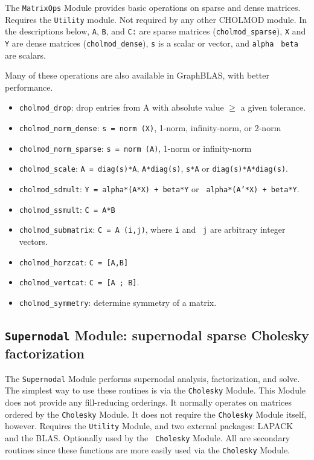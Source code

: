 \documentclass[11pt]{article}
\begin{document}
The {\tt MatrixOps} Module provides basic operations on sparse and dense
matrices.  Requires the {\tt Utility} module.  Not required by any other
CHOLMOD module.  In the descriptions below, {\tt A}, {\tt B}, and {\tt C:} are
sparse matrices ({\tt cholmod\_sparse}), {\tt X} and {\tt Y} are dense matrices
({\tt cholmod\_dense}), {\tt s} is a scalar or vector, and {\tt alpha} {\tt
beta} are scalars.

Many of these operations are also available in GraphBLAS, with better
performance.

    \begin{itemize}
    \item {\tt cholmod\_drop}: drop entries from A with absolute value $\ge$ a
        given tolerance.
    \item {\tt cholmod\_norm\_dense}: {\tt s = norm (X)}, 1-norm,
        infinity-norm, or 2-norm
    \item {\tt cholmod\_norm\_sparse}: {\tt s = norm (A)}, 1-norm or
        infinity-norm
    \item {\tt cholmod\_scale}: {\tt A = diag(s)*A}, {\tt A*diag(s)}, {\tt s*A}
        or {\tt diag(s)*A*diag(s)}.
    \item {\tt cholmod\_sdmult}: {\tt Y = alpha*(A*X) + beta*Y} or {\tt
        alpha*(A'*X) + beta*Y}.
    \item {\tt cholmod\_ssmult}: {\tt C = A*B}
    \item {\tt cholmod\_submatrix}: {\tt C = A (i,j)}, where {\tt i} and {\tt
        j} are arbitrary integer vectors.
    \item {\tt cholmod\_horzcat}: {\tt C = [A,B]}
    \item {\tt cholmod\_vertcat}: {\tt C = [A ; B]}.
    \item {\tt cholmod\_symmetry}: determine symmetry of a matrix.
    \end{itemize}

\subsection{{\tt Supernodal} Module: supernodal sparse Cholesky factorization}

The {\tt Supernodal} Module performs supernodal analysis, factorization, and
solve.  The simplest way to use these routines is via the {\tt Cholesky}
Module.  This Module does not provide any fill-reducing orderings.  It normally
operates on matrices ordered by the {\tt Cholesky} Module.  It does not require
the {\tt Cholesky} Module itself, however.  Requires the {\tt Utility} Module,
and two external packages: LAPACK and the BLAS.  Optionally used by the {\tt
Cholesky} Module.  All are secondary routines since these functions are more
easily used via the {\tt Cholesky} Module.
\end{document}
